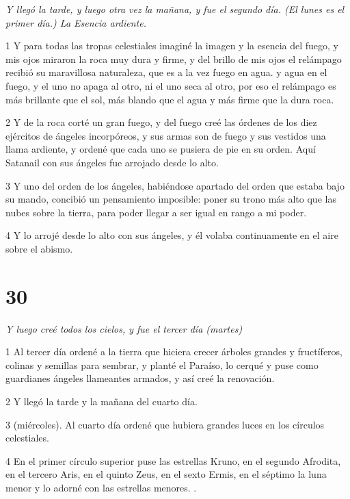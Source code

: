 \par \textit{Y llegó la tarde, y luego otra vez la mañana, y fue el segundo día. (El lunes es el primer día.) La Esencia ardiente.}

\par 1 Y para todas las tropas celestiales imaginé la imagen y la esencia del fuego, y mis ojos miraron la roca muy dura y firme, y del brillo de mis ojos el relámpago recibió su maravillosa naturaleza, que es a la vez fuego en agua. y agua en el fuego, y el uno no apaga al otro, ni el uno seca al otro, por eso el relámpago es más brillante que el sol, más blando que el agua y más firme que la dura roca.

\par 2 Y de la roca corté un gran fuego, y del fuego creé las órdenes de los diez ejércitos de ángeles incorpóreos, y sus armas son de fuego y sus vestidos una llama ardiente, y ordené que cada uno se pusiera de pie en su orden. Aquí Satanail con sus ángeles fue arrojado desde lo alto.

\par 3 Y uno del orden de los ángeles, habiéndose apartado del orden que estaba bajo su mando, concibió un pensamiento imposible: poner su trono más alto que las nubes sobre la tierra, para poder llegar a ser igual en rango a mi poder.

\par 4 Y lo arrojé desde lo alto con sus ángeles, y él volaba continuamente en el aire sobre el abismo.

\chapter{30}

\par \textit{Y luego creé todos los cielos, y fue el tercer día (martes)}

\par 1 Al tercer día ordené a la tierra que hiciera crecer árboles grandes y fructíferos, colinas y semillas para sembrar, y planté el Paraíso, lo cerqué y puse como guardianes ángeles llameantes armados, y así creé la renovación.

\par 2 Y llegó la tarde y la mañana del cuarto día.

\par 3 (miércoles). Al cuarto día ordené que hubiera grandes luces en los círculos celestiales.

\par 4 En el primer círculo superior puse las estrellas Kruno, en el segundo Afrodita, en el tercero Aris, en el quinto Zeus, en el sexto Ermis, en el séptimo la luna menor y lo adorné con las estrellas menores. .

